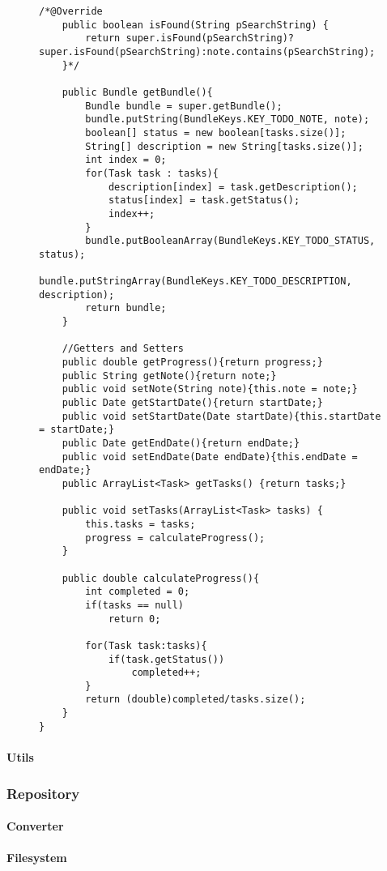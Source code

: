 \begin{figure}[H]
\begin{lstlisting}[caption=Todo (Joscha Nassenstein)]
    /*@Override
    public boolean isFound(String pSearchString) {
        return super.isFound(pSearchString)?super.isFound(pSearchString):note.contains(pSearchString);
    }*/

    public Bundle getBundle(){
        Bundle bundle = super.getBundle();
        bundle.putString(BundleKeys.KEY_TODO_NOTE, note);
        boolean[] status = new boolean[tasks.size()];
        String[] description = new String[tasks.size()];
        int index = 0;
        for(Task task : tasks){
            description[index] = task.getDescription();
            status[index] = task.getStatus();
            index++;
        }
        bundle.putBooleanArray(BundleKeys.KEY_TODO_STATUS, status);
        bundle.putStringArray(BundleKeys.KEY_TODO_DESCRIPTION, description);
        return bundle;
    }

    //Getters and Setters
    public double getProgress(){return progress;}
    public String getNote(){return note;}
    public void setNote(String note){this.note = note;}
    public Date getStartDate(){return startDate;}
    public void setStartDate(Date startDate){this.startDate = startDate;}
    public Date getEndDate(){return endDate;}
    public void setEndDate(Date endDate){this.endDate = endDate;}
    public ArrayList<Task> getTasks() {return tasks;}

    public void setTasks(ArrayList<Task> tasks) {
        this.tasks = tasks;
        progress = calculateProgress();
    }

    public double calculateProgress(){
        int completed = 0;
        if(tasks == null)
            return 0;

        for(Task task:tasks){
            if(task.getStatus())
                completed++;
        }
        return (double)completed/tasks.size();
    }
}
\end{lstlisting}
\end{figure}

		\paragraph{Utils}
	\subsubsection{Repository}
		\paragraph{Converter}
		\paragraph{Filesystem}
